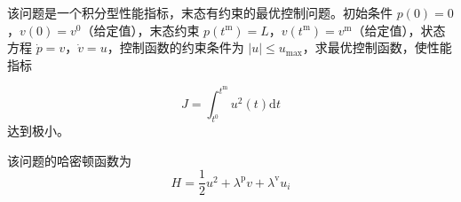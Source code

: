 \documentclass[UTF8]{ctexart}
\begin{document}
\tableofcontent


该问题是一个积分型性能指标，末态有约束的最优控制问题。初始条件 $p(0)=0$，$v(0)=v^0$（给定值），末态约束 $p(t^\mathrm{m})=L$，$v(t^\mathrm{m})=v^\mathrm{m}$（给定值），状态方程 $\dot{p}=v$，$\dot{v}=u$，控制函数的约束条件为 $|u|\leq u_\max$，求最优控制函数，使性能指标

\begin{equation}
J=\int_{t^0}^{t^\mathrm{m}} u^2(t)\mathrm{d}t
\end{equation}
达到极小。

该问题的哈密顿函数为
\begin{equation}
H=\frac12u^2+\lambda^\mathrm{p}v+\lambda^\mathrm{v}u_i
\end{equation}



\end{document}
